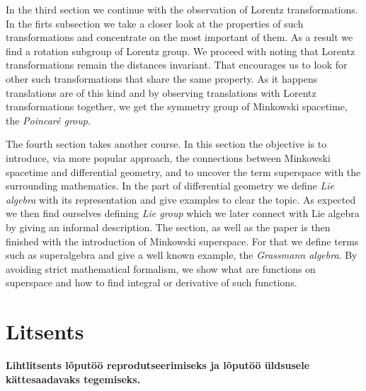 \documentclass[12pt,a4paper,oneside]{article}
\theoremstyle{plain}
\theoremstyle{definition}
\numberwithin{equation}{section}
\renewcommand\refname{Viited}
\begin{document}
In the third section we continue with the observation 
of Lorentz transformations. In the firts subsection we 
take a closer look at the properties of such 
transformations and concentrate on the most important of 
them. As a result we find a rotation subgroup of Lorentz 
group. We proceed with noting that Lorentz transformations 
remain the distances invariant. That encourages us to 
look for other such transformations that share the same 
property. As it happens translations are of this kind and 
by observing translations with Lorentz transformations 
together, we get the symmetry group of Minkowski spacetime, 
the \emph{Poincar\'e group}.

The fourth section takes another course. In this section 
the objective is to introduce, via more popular approach, 
the connections between Minkowski spacetime and 
differential geometry, and to uncover the term superspace 
with the surrounding mathematics. In the part of 
differential geometry we define \emph{Lie algebra} with 
its representation and give examples to 
clear the topic. As expected we then find ourselves 
defining \emph{Lie group} which we later connect with 
Lie algebra by giving an informal description. The section,
as well as the paper is then finished with the 
introduction of Minkowski superspace. For that we define 
terms such as superalgebra and give a well known example, 
the \emph{Grassmann algebra}. By avoiding strict 
mathematical formalism, we show what are functions on 
superspace and how to find integral or derivative of such 
functions.

\newpage

\renewcommand{\refname}{Viited}


\newpage
\pagestyle{empty}
\section*{Litsents}

\textbf{Lihtlitsents lõputöö reprodutseerimiseks ja 
	lõputöö üldsusele kätte\-saadavaks tegemiseks.}
\end{document}
